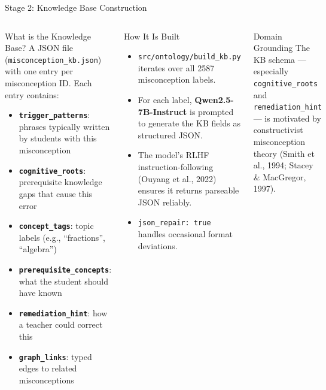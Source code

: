 \documentclass[aspectratio=169]{beamer}
\begin{document}
\begin{frame}{Stage 2: Knowledge Base Construction}
\begin{columns}[T]
\begin{block}{What is the Knowledge Base?}
A JSON file (\texttt{misconception\_kb.json}) with one entry per misconception ID. Each entry contains:
\begin{itemize}
  \item \textbf{\texttt{trigger\_patterns}}: phrases typically written by students with this misconception
  \item \textbf{\texttt{cognitive\_roots}}: prerequisite knowledge gaps that cause this error
  \item \textbf{\texttt{concept\_tags}}: topic labels (e.g., ``fractions'', ``algebra'')
  \item \textbf{\texttt{prerequisite\_concepts}}: what the student should have known
  \item \textbf{\texttt{remediation\_hint}}: how a teacher could correct this
  \item \textbf{\texttt{graph\_links}}: typed edges to related misconceptions
\end{itemize}
\end{block}
\begin{block}{How It Is Built}
\begin{itemize}
  \item \texttt{src/ontology/build\_kb.py} iterates over all 2587 misconception labels.
  \item For each label, \textbf{Qwen2.5-7B-Instruct} is prompted to generate the KB fields as structured JSON.
  \item The model's RLHF instruction-following (Ouyang et al., 2022) ensures it returns parseable JSON reliably.
  \item \texttt{json\_repair: true} handles occasional format deviations.
\end{itemize}
\end{block}
\vspace{8pt}
\begin{block}{Domain Grounding}
The KB schema --- especially \texttt{cognitive\_roots} and \texttt{remediation\_hint} --- is motivated by constructivist misconception theory (Smith et al., 1994; Stacey \& MacGregor, 1997).
\end{block}
\end{columns}
\end{frame}
\end{document}
